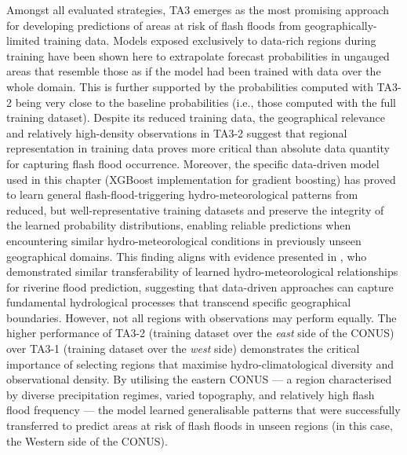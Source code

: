 Amongst  all evaluated strategies, TA3 emerges as the most promising approach for developing predictions of areas at risk of flash floods from geographically-limited training data. Models exposed exclusively to data-rich regions during training have been shown here to extrapolate forecast probabilities in ungauged areas that resemble those as if the model had been trained with data over the whole domain. This is further supported by the probabilities computed with TA3-2 being very close to the baseline probabilities (i.e., those computed with the full training dataset). Despite its reduced training data, the geographical relevance and relatively high-density observations in TA3-2 suggest that regional representation in training data proves more critical than absolute data quantity for capturing flash flood occurrence. Moreover, the specific data-driven model used in this chapter (XGBoost implementation for gradient boosting) has proved to learn general flash-flood-triggering hydro-meteorological patterns from reduced, but well-representative training datasets and preserve the integrity of the learned probability distributions, enabling reliable predictions when encountering similar hydro-meteorological conditions in previously unseen geographical domains. This finding aligns with evidence presented in \citet{Kratzert_2024}, who demonstrated similar transferability of learned hydro-meteorological relationships for riverine flood prediction, suggesting that data-driven approaches can capture fundamental hydrological processes that transcend specific geographical boundaries. However, not all regions with observations may perform equally. The higher performance of TA3-2 (training dataset over the \textit{east} side of the CONUS) over TA3-1 (training dataset over the \textit{west} side) demonstrates the critical importance of selecting regions that maximise hydro-climatological diversity and observational density. By utilising the eastern CONUS — a region characterised by diverse precipitation regimes, varied topography, and relatively high flash flood frequency — the model learned generalisable patterns that were successfully transferred to predict areas at risk of flash floods in unseen regions (in this case, the Western side of the CONUS). 

